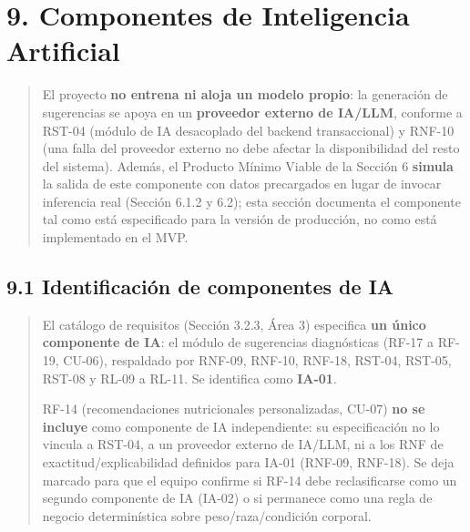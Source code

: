 \documentclass[
]{article}
\begin{document}
 \section{9. Componentes de Inteligencia Artificial}
\label{s9-componentes-ia}

\begin{quote}
El proyecto \textbf{no entrena ni aloja un modelo propio}: la generación de
sugerencias se apoya en un \textbf{proveedor externo de IA/LLM}, conforme a
RST-04 (módulo de IA desacoplado del backend transaccional) y RNF-10 (una falla
del proveedor externo no debe afectar la disponibilidad del resto del
sistema). Además, el Producto Mínimo Viable de la Sección 6
\textbf{simula} la salida de este componente con datos precargados en lugar de
invocar inferencia real (Sección 6.1.2 y 6.2); esta sección documenta el
componente tal como está especificado para la versión de producción, no como
está implementado en el MVP.
\end{quote}

\subsection{9.1 Identificación de componentes de IA}
\label{s9-1-identificacion}

\begin{quote}
El catálogo de requisitos (Sección 3.2.3, Área 3) especifica
\textbf{un único componente de IA}: el módulo de sugerencias diagnósticas
(RF-17 a RF-19, CU-06), respaldado por RNF-09, RNF-10, RNF-18, RST-04,
RST-05, RST-08 y RL-09 a RL-11. Se identifica como \textbf{IA-01}.

RF-14 (recomendaciones nutricionales personalizadas, CU-07)
\textbf{no se incluye} como componente de IA independiente: su especificación
no lo vincula a RST-04, a un proveedor externo de IA/LLM, ni a los RNF de
exactitud/explicabilidad definidos para IA-01 (RNF-09, RNF-18). Se deja
marcado para que el equipo confirme si RF-14 debe reclasificarse como un
segundo componente de IA (IA-02) o si permanece como una regla de negocio
determinística sobre peso/raza/condición corporal.
\end{quote}
\end{document}
